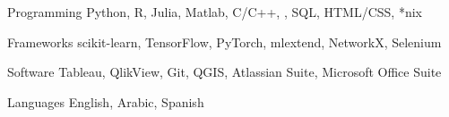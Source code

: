 


\begin{cvskills}
\cvskill
{Programming} %
{Python, R,  Julia, Matlab, C/C++, \LaTex , SQL, HTML/CSS, *nix} %

\cvskill
{Frameworks} %
{scikit-learn, TensorFlow, PyTorch, mlextend, NetworkX, Selenium} %



\cvskill
{Software} %
{Tableau, QlikView, Git, QGIS, Atlassian Suite, Microsoft Office Suite} %


\cvskill
{Languages} %
{English, Arabic, Spanish} %


\end{cvskills}
